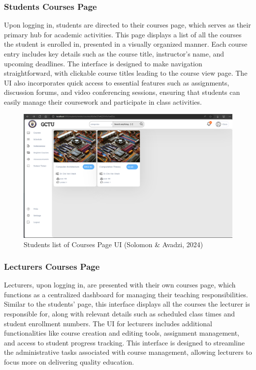 \documentclass[a4paper,12pt]{article}  %
\begin{document}
\subsubsection{Students Courses Page}
Upon logging in, students are directed to their courses page, which serves as their primary hub for academic activities. This page displays a list of all the courses the student is enrolled in, presented in a visually organized manner. Each course entry includes key details such as the course title, instructor's name, and upcoming deadlines. The interface is designed to make navigation straightforward, with clickable course titles leading to the course view page. The UI also incorporates quick access to essential features such as assignments, discussion forums, and video conferencing sessions, ensuring that students can easily manage their coursework and participate in class activities.\\

\begin{figure}[H]
      \centering
      \includegraphics[width=1\textwidth]{figures/students-courses.png}
      \caption{Students list of Courses Page UI (Solomon \& Avadzi, 2024)}
\end{figure}

\subsubsection{Lecturers Courses Page}
Lecturers, upon logging in, are presented with their own courses page, which functions as a centralized dashboard for managing their teaching responsibilities. Similar to the students' page, this interface displays all the courses the lecturer is responsible for, along with relevant details such as scheduled class times and student enrollment numbers. The UI for lecturers includes additional functionalities like course creation and editing tools, assignment management, and access to student progress tracking. This interface is designed to streamline the administrative tasks associated with course management, allowing lecturers to focus more on delivering quality education.\\
\end{document}
